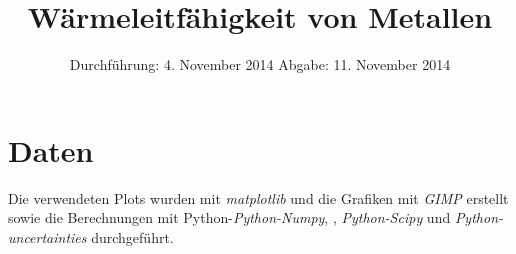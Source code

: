 
\usepackage{longtable}

\subject{Versuch 204}
\title{Wärmeleitfähigkeit von Metallen}

\date{
  Durchführung: 4. November 2014
  \hspace{1em}
  Abgabe: 11. November 2014
}


\maketitle
\thispagestyle{empty}
\newpage





\newpage
\section{Daten}




\printbibliography
\noindent Die verwendeten Plots wurden mit \textit{matplotlib}\cite{matplotlib} und die Grafiken mit \textit{GIMP}\cite{gimp} erstellt sowie die Berechnungen mit Python-\textit{Python-Numpy}, \cite{numpy}, \textit{Python-Scipy}\cite{scipy} und \textit{Python-uncertainties}\cite{uncertainties} durchgeführt.

